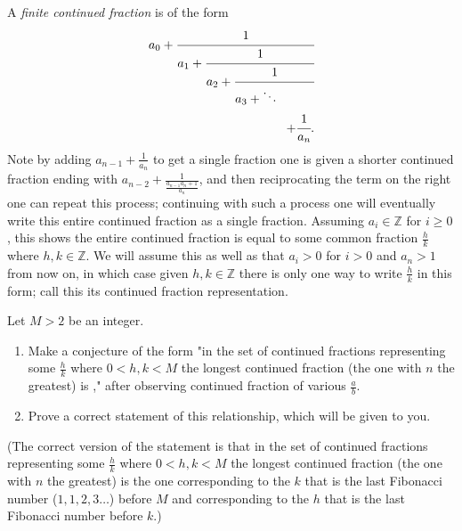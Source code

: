 \documentclass[letterpaper,12pt]{article}
\def\Z{\mathbb Z}
\begin{document}
A \emph{finite continued fraction} is of the form
\[
a_0+\cfrac{1}{a_1+
\cfrac{1}{a_2+
\cfrac{1}{\begin{split}a_3+\ddots\qquad \quad\\
+\cfrac{1}{a_n}.\end{split}
}}}
\]
Note by adding $a_{n-1}+\frac{1}{a_n}$ to get a single fraction one is given a shorter continued fraction ending with $a_{n-2}+\frac{1}{\frac{a_{n-1}a_n+1}{a_n}}$, and then reciprocating the term on the right one can repeat this process; continuing with such a process one will eventually write this entire continued fraction as a single fraction. Assuming $a_i\in\Z$ for $i\ge0$, this shows the entire continued fraction is equal to some common fraction $\frac{h}{k}$ where $h,k\in \Z$. We will assume this as well as that $a_i>0$ for $i>0$ and $a_n>1$ from now on, in which case given $h,k\in \Z$ there is only one way to write $\frac{h}{k}$ in this form; call this its continued fraction representation.

Let $M>2$ be an integer.

\begin{enumerate}

\item
Make a conjecture of the form "in the set of continued fractions representing some $\frac{h}{k}$ where $0<h,k<M$ the longest continued fraction (the one with $n$ the greatest) is \underline{\hspace{3cm}}," after observing continued fraction of various $\frac{a}{b}$.

\item
Prove a correct statement of this relationship, which will be given to you.

\end{enumerate}
(The correct version of the statement is that in the set of continued fractions representing some $\frac{h}{k}$ where $0<h,k<M$ the longest continued fraction (the one with $n$ the greatest) is the one corresponding to the $k$ that is the last Fibonacci number ($1,1,2,3\dots$) before $M$ and corresponding to the $h$ that is the last Fibonacci number before $k$.)
\end{document}

